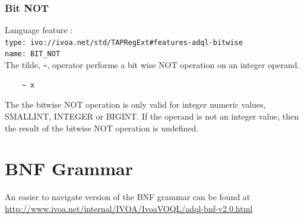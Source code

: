 \documentclass[11pt,a4paper]{ivoa}
\begin{document}
\subsubsection{Bit NOT}
\label{sec:bitwise.not}
{\footnotesize Language feature :}\\
{\footnotesize \verb|type: ivo://ivoa.net/std/TAPRegExt#features-adql-bitwise|}\\
{\footnotesize \verb|name: BIT_NOT|}\\

The tilde, \verb:~:, operator performs a bit wise NOT operation on an integer operand.

\begin{verbatim}
    ~ x
\end{verbatim}

The the bitwise NOT operation is only valid for integer numeric values, 
SMALLINT, INTEGER or BIGINT.
If the operand is not an integer value, then the result of the bitwise
NOT operation is undefined.

\appendix
\section{BNF Grammar}
\label{sec:grammar}

An easier to navigate version of the BNF grammar can be found at\\
\url{http://www.ivoa.net/internal/IVOA/IvoaVOQL/adql-bnf-v2.0.html}
\end{document}
